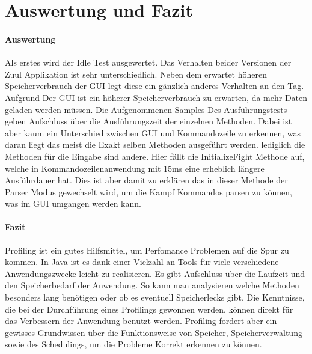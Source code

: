 \documentclass{article}
\begin{document}
\section{Auswertung und Fazit}
\paragraph{Auswertung}
Als erstes wird der Idle Test ausgewertet. Das Verhalten beider Versionen der Zuul Applikation ist sehr unterschiedlich. Neben dem erwartet höheren Speicherverbrauch der GUI legt diese ein gänzlich anderes Verhalten an den Tag. Aufgrund Der GUI ist ein höherer Speicherverbrauch zu erwarten, da mehr Daten geladen werden müssen. Die Aufgenommenen Samples Des Ausführungstests geben Aufschluss über die Ausführungszeit der einzelnen Methoden. Dabei ist aber kaum ein Unterschied zwischen GUI und Kommandozeile zu erkennen, was daran liegt das meist die Exakt selben Methoden ausgeführt werden. lediglich die Methoden für die Eingabe sind andere. Hier fällt die InitializeFight Methode auf, welche in Kommandozeilenanwendung mit 15ms eine erheblich längere Ausführdauer hat. Dies ist aber damit zu erklären das in dieser Methode der Parser Modus gewechselt wird, um die Kampf Kommandos parsen zu können, was im GUI umgangen werden kann.

\paragraph{Fazit}
Profiling ist ein gutes Hilfsmittel, um Perfomance Problemen auf die Spur zu kommen. In Java ist es dank einer Vielzahl an Tools für viele verschiedene Anwendungszwecke leicht zu realisieren. Es gibt Aufschluss über die Laufzeit und den Speicherbedarf der Anwendung. So kann man analysieren welche Methoden besonders lang benötigen oder ob es eventuell Speicherlecks gibt. Die Kenntnisse, die bei der Durchführung eines Profilings gewonnen werden, können direkt für das Verbessern der Anwendung benutzt werden. Profiling fordert aber ein gewisses Grundwissen über die Funktionsweise von Speicher, Speicherverwaltung sowie des Schedulings, um die Probleme Korrekt erkennen zu können.



\pagebreak
\end{document}
